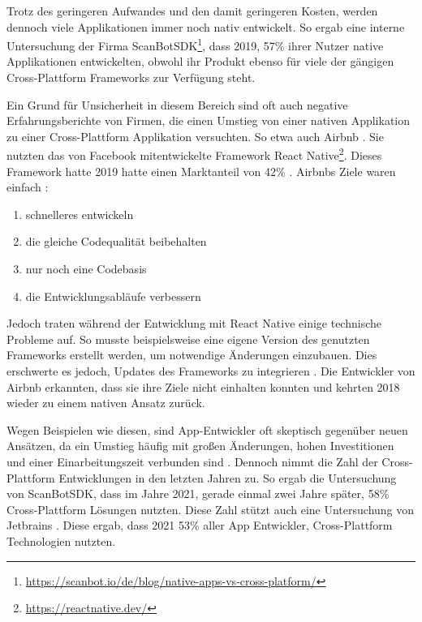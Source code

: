 Trotz des geringeren Aufwandes und den damit geringeren Kosten, werden dennoch viele Applikationen immer noch nativ entwickelt. So ergab eine interne Untersuchung der Firma ScanBotSDK\footnote{\label{scanbot_footnote}\url{https://scanbot.io/de/blog/native-apps-vs-cross-platform/}}, dass 2019, 57\% ihrer Nutzer native Applikationen entwickelten, obwohl ihr Produkt ebenso für viele der gängigen Cross-Plattform Frameworks zur Verfügung steht.

Ein Grund für Unsicherheit in diesem Bereich sind oft auch negative Erfahrungsberichte von Firmen, die einen Umstieg von einer nativen Applikation zu einer Cross-Plattform Applikation versuchten. So etwa auch Airbnb \cite{Airbnb_react_goals}. Sie nutzten das von Facebook mitentwickelte Framework React Native\footnote{\url{https://reactnative.dev/}}. Dieses Framework hatte 2019 hatte einen Marktanteil von 42\% \cite{statist_CP_Framework}. 
\break
Airbnbs Ziele waren einfach \cite{statist_CP_Framework}:
\begin{enumerate}%
    \item schnelleres entwickeln
    \item die gleiche Codequalität beibehalten
    \item nur noch eine Codebasis
    \item die Entwicklungsabläufe verbessern
\end{enumerate}
\nointerlineskip
Jedoch traten während der Entwicklung mit React Native einige technische Probleme auf. So musste beispielsweise eine eigene Version des genutzten Frameworks erstellt werden, um notwendige Änderungen einzubauen. Dies erschwerte es jedoch, Updates des Frameworks zu integrieren \cite{Airbnb_technology}. Die Entwickler von Airbnb erkannten, dass sie ihre Ziele nicht einhalten konnten und kehrten 2018 wieder zu einem nativen Ansatz zurück.

Wegen Beispielen wie diesen, sind App-Entwickler oft skeptisch gegenüber neuen Ansätzen, da ein Umstieg häufig mit großen Änderungen, hohen Investitionen und einer Einarbeitungszeit verbunden sind \cite{medium_Lehtimäki}. Dennoch nimmt die Zahl der Cross-Plattform Entwicklungen in den letzten Jahren zu. 
So ergab die Untersuchung von ScanBotSDK, dass im Jahre 2021, gerade einmal zwei Jahre später, 58\% Cross-Plattform Lösungen nutzten. Diese Zahl stützt auch eine Untersuchung von Jetbrains \cite{JetBrains_miscellaneous_2021}. Diese ergab, dass 2021 53\% aller App Entwickler, Cross-Plattform Technologien nutzten.

